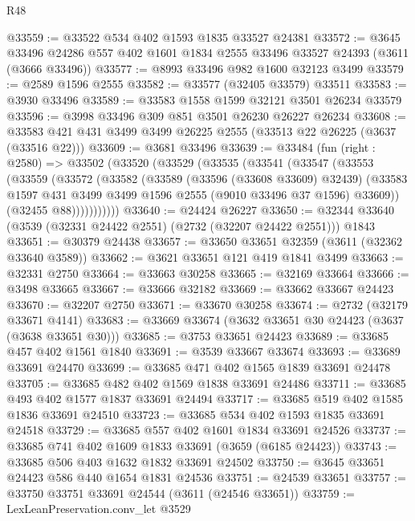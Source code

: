 \begin{lexlean}{R48}
\begin{coremodule}
@33559 := @33522 @534 @402 @1593 @1835 @33527 @24381
@33572 := @3645
    @33496
    @24286
    @557
    @402
    @1601
    @1834
    @2555
    @33496
    @33527
    @24393
    (@3611 (@3666 @33496))
@33577 := @8993 @33496 @982 @1600 @32123 @3499
@33579 := @2589 @1596 @2555
@33582 := @33577 (@32405 @33579) @33511
@33583 := @3930 @33496
@33589 := @33583 @1558 @1599 @32121 @3501 @26234 @33579
@33596 := @3998 @33496 @309 @851 @3501 @26230 @26227 @26234
@33608 := @33583 @421 @431 @3499 @3499 @26225 @2555 (@33513 @22 @26225 (@3637 (@33516 @22)))
@33609 := @3681 @33496
@33639 := @33484
    (fun (right : @2580) =>
    @33502
      (@33520
        (@33529
          (@33535
            (@33541
              (@33547
                (@33553
                  (@33559
                    (@33572
                      (@33582
                        (@33589
                          (@33596 (@33608 @33609) @32439)
                          (@33583
                            @1597
                            @431
                            @3499
                            @3499
                            @1596
                            @2555
                            (@9010 @33496 @37 @1596)
                            @33609))
                        (@32455 @88)))))))))))
@33640 := @24424 @26227
@33650 := @32344 @33640 (@3539 (@32331 @24422 @2551) (@2732 (@32207 @24422 @2551))) @1843
@33651 := @30379 @24438
@33657 := @33650 @33651 @32359 (@3611 (@32362 @33640 @3589))
@33662 := @3621 @33651 @121 @419 @1841 @3499
@33663 := @32331 @2750
@33664 := @33663 @30258
@33665 := @32169 @33664
@33666 := @3498 @33665
@33667 := @33666 @32182
@33669 := @33662 @33667 @24423
@33670 := @32207 @2750
@33671 := @33670 @30258
@33674 := @2732 (@32179 @33671 @4141)
@33683 := @33669 @33674 (@3632 @33651 @30 @24423 (@3637 (@3638 @33651 @30)))
@33685 := @3753 @33651 @24423
@33689 := @33685 @457 @402 @1561 @1840
@33691 := @3539 @33667 @33674
@33693 := @33689 @33691 @24470
@33699 := @33685 @471 @402 @1565 @1839 @33691 @24478
@33705 := @33685 @482 @402 @1569 @1838 @33691 @24486
@33711 := @33685 @493 @402 @1577 @1837 @33691 @24494
@33717 := @33685 @519 @402 @1585 @1836 @33691 @24510
@33723 := @33685 @534 @402 @1593 @1835 @33691 @24518
@33729 := @33685 @557 @402 @1601 @1834 @33691 @24526
@33737 := @33685 @741 @402 @1609 @1833 @33691 (@3659 (@6185 @24423))
@33743 := @33685 @506 @403 @1632 @1832 @33691 @24502
@33750 := @3645 @33651 @24423 @586 @440 @1654 @1831 @24536
@33751 := @24539 @33651
@33757 := @33750 @33751 @33691 @24544 (@3611 (@24546 @33651))
@33759 := LexLeanPreservation.conv_let @3529

\end{coremodule}
\end{lexlean}
